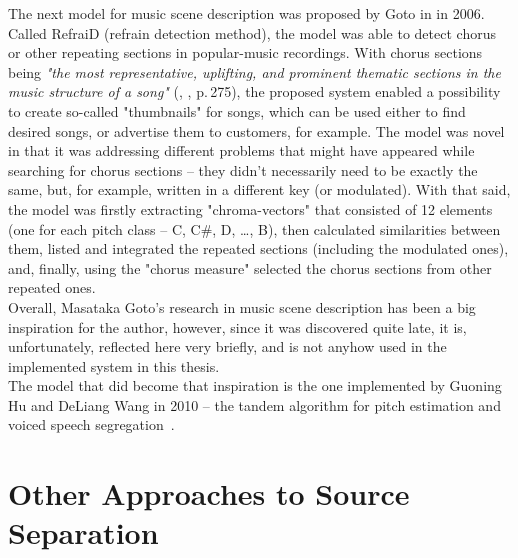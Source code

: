 The next model for music scene description was proposed by Goto in \cite{Goto2006} in 2006. Called RefraiD (refrain detection method), the model was able to detect chorus or other repeating sections in popular-music recordings. With chorus sections being \textit{"the most representative, uplifting, and prominent thematic sections in the music structure of a song"} (\cite{Goto2006}, \cite{Wang2006}, p.\,275), the proposed system enabled a possibility to create so-called "thumbnails" for songs, which can be used either to find desired songs, or advertise them to customers, for example. The model was novel in that it was addressing different problems that might have appeared while searching for chorus sections -- they didn't necessarily need to be exactly the same, but, for example, written in a different key (or modulated). With that said, the model was firstly extracting "chroma-vectors" that consisted of 12 elements (one for each pitch class -- C, C\#, D, \dots{}, B), then calculated similarities between them, listed and integrated the repeated sections (including the modulated ones), and, finally, using the "chorus measure" selected the chorus sections from other repeated ones.\\

Overall, Masataka Goto's research in music scene description has been a big inspiration for the author, however, since it was discovered quite late, it is, unfortunately, reflected here very briefly, and is not anyhow used in the implemented system in this thesis.\\

The model that did become that inspiration is the one implemented by Guoning Hu and DeLiang Wang in 2010 -- the tandem algorithm for pitch estimation and voiced speech seg\-re\-ga\-tion~\cite{Hu2010}. 


\section{Other Approaches to Source Separation}

